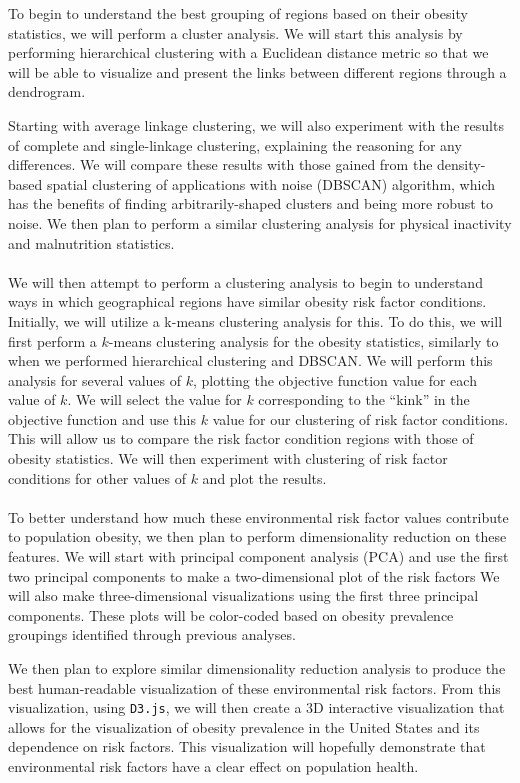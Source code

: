 \documentclass{article}
\begin{document}
To begin to understand the best grouping of regions based on their obesity statistics, we will perform a cluster analysis. We will start this analysis by performing hierarchical clustering with a Euclidean distance metric so that we will be able to visualize and present the links between different regions through a dendrogram. 

Starting with average linkage clustering, we will also experiment with the results of complete and single-linkage clustering, explaining the reasoning for any differences. 
We will compare these results with those gained from the density-based spatial clustering of applications with noise (DBSCAN) algorithm, which has the benefits of finding arbitrarily-shaped clusters and being more robust to noise. 
We then plan to perform a similar clustering analysis for physical inactivity and malnutrition statistics.
\\\\
We will then attempt to perform a clustering analysis to begin to understand ways in which geographical regions have similar obesity risk factor conditions. 
Initially, we will utilize a k-means clustering analysis for this. To do this, we will first perform a $k$-means clustering analysis for the obesity statistics, similarly to when we performed hierarchical clustering and DBSCAN. 
We will perform this analysis for several values of $k$, plotting the objective function value for each value of $k$. We will select the value for $k$ corresponding to the “kink” in the objective function and use this $k$ value for our clustering of risk factor conditions. This will allow us to compare the risk factor condition regions with those of obesity statistics. We will then experiment with clustering of risk factor conditions for other values of $k$ and plot the results.
\\\\
To better understand how much these environmental risk factor values contribute to population obesity, we then plan to perform dimensionality reduction on these features. We will start with principal component analysis (PCA) and use the first two principal components to make a two-dimensional plot of the risk factors 
We will also make three-dimensional visualizations using the first three principal components. These plots will be color-coded based on obesity prevalence groupings identified through previous analyses.

We then plan to explore similar dimensionality reduction analysis to produce the best human-readable visualization of these environmental risk factors. From this visualization, using \verb|D3.js|, we will then create a 3D interactive visualization that allows for the visualization of obesity prevalence in the United States and its dependence on risk factors. This visualization will hopefully demonstrate that environmental risk factors have a clear effect on population health.
\end{document}
